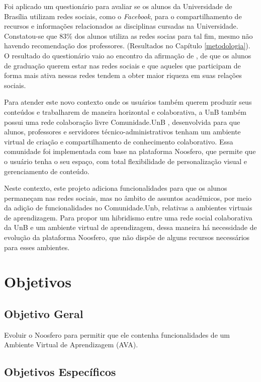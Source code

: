 Foi aplicado um questionário para avaliar se os alunos da Universidade de Brasília utilizam redes sociais, como o \textit{Facebook}, para o compartilhamento de recursos e informações relacionados as disciplinas cursadas na Universidade. Constatou-se que 83\% dos alunos utiliza as redes socias para tal fim, mesmo não havendo recomendação dos professores. (Resultados no Capítulo \ref{metodologia}). O resultado do questionário vaio ao encontro da afirmação de , de que os alunos de graduação querem estar nas redes sociais e que aqueles que participam de forma mais ativa nessas redes tendem a obter maior riqueza em suas relações sociais.

Para atender este novo contexto onde os usuários também querem produzir seus conteúdos e trabalharem de maneira horizontal e colaborativa, a UnB também possui uma rede colaboração livre Comunidade.UnB , desenvolvida para que alunos, professores e servidores técnico-administrativos tenham um ambiente virtual de criação e compartilhamento de conhecimento colaborativo. Essa comunidade foi implementada com base na plataforma Noosfero, que permite que o usuário tenha o seu espaço, com total flexibilidade de personalização visual e gerenciamento de conteúdo.

Neste contexto, este projeto adiciona funcionalidades para que os alunos permaneçam nas redes sociais, mas no âmbito de assuntos acadêmicos, por meio da adição de funcionalidades no Comunidade.Unb, relativas a ambientes virtuais de aprendizagem. Para propor um hibridismo entre uma rede social colaborativa da UnB e um ambiente virtual de aprendizagem, dessa maneira há necessidade de evolução da plataforma Noosfero, que não dispõe de alguns recursos necessários para esses ambientes.

\section{Objetivos}

\subsection{Objetivo Geral}

Evoluir o Noosfero para permitir que ele contenha funcionalidades de um Ambiente Virtual de Aprendizagem (AVA).

\subsection{Objetivos Específicos}

